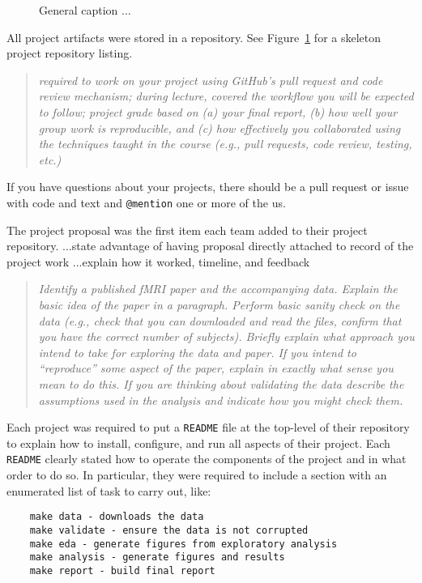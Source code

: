 \begin{figure}
\centering

\caption{General caption ...}
\label{fig:repo}
\end{figure}

All project artifacts were stored in a repository.
See Figure~\ref{fig:repo} for a skeleton project repository listing.

\begin{quote}\emph{
required to work on your project using GitHub's pull request and code review mechanism;
during lecture, covered the workflow you will be expected to follow;
project grade based on (a) your final report, (b) how well your group work is
reproducible, and (c) how effectively you collaborated using the techniques
taught in the course (e.g., pull requests, code review, testing, etc.)
}\end{quote}


If you have questions about your projects, there should be a pull request
or issue with code and text and \texttt{@mention} one or more of the us.

The project proposal was the first item each team added to their project repository.
...state advantage of having proposal directly attached to record of the
project work
...explain how it worked, timeline, and feedback

\begin{quote}\emph{
Identify a published fMRI paper and the accompanying data.
Explain the basic idea of the paper in a paragraph.
Perform basic sanity check on the data
(e.g., check that you can downloaded and read the files,
confirm that you have the correct number of subjects).
Briefly explain what approach you intend to take for exploring
the data and paper.  If you intend to ``reproduce'' some aspect of the paper,
explain in exactly what sense you mean to do this.  If you are thinking about
validating the data describe the assumptions used in the analysis and indicate
how you might check them.
}\end{quote}

Each project was required to put a \texttt{README} file at the top-level
of their repository to explain how to install, configure,
and run all aspects of their project.
Each \texttt{README} clearly stated  how to operate the
components of the project and in what order to do so.
In particular, they were required to include a section with
an enumerated list of task to carry out, like:
\begin{verbatim}
    make data - downloads the data 
    make validate - ensure the data is not corrupted
    make eda - generate figures from exploratory analysis
    make analysis - generate figures and results
    make report - build final report
\end{verbatim}

